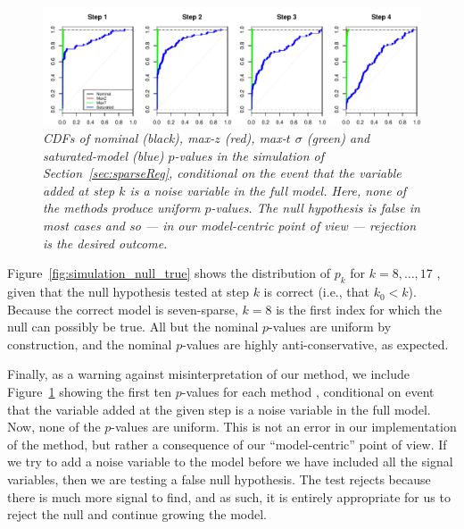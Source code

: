 \documentclass{article}
\begin{document}

\begin{figure}[h]
  \centering
  \includegraphics[width=1\textwidth]{figs/simulation_snr_5_alpha_05_noise_var.pdf}
  \caption{\em CDFs of nominal (black), max-$z$ (red), max-$t$ $\sigma$ (green) and  saturated-model (blue) $p$-values in the simulation of Section~\ref{sec:sparseReg}, conditional on the event that the variable added at step $k$ is a noise variable in the full model. Here, none of the methods produce uniform $p$-values. The null hypothesis is false in most cases and so --- in our model-centric point of view --- rejection is the desired outcome.}
  \label{fig:simulation_noise_var}
\end{figure}

Figure~\ref{fig:simulation_null_true} shows the distribution of $p_k$ for $k = 8, \ldots, 17$ , given that the null hypothesis tested at step $k$ is correct (i.e., that $k_0< k$). Because the correct model is seven-sparse, $k=8$ is the first index for which the null can possibly be true. All but the nominal $p$-values are uniform by construction, and the nominal $p$-values are highly anti-conservative, as expected.

Finally, as a warning against misinterpretation of our method, we include Figure~\ref{fig:simulation_noise_var} showing the first ten $p$-values for each method , conditional on event that the variable added at the given step is a noise variable in the full model. Now, none of the $p$-values are uniform. This is not an error in our implementation of the method, but rather a consequence of our ``model-centric'' point of view. If we try to add a noise variable to the model before we have included all the signal variables, then we are testing a false null hypothesis. The test rejects because there is much more signal to find, and as such, it is entirely appropriate for us to reject the null and continue growing the model.  
\end{document}
